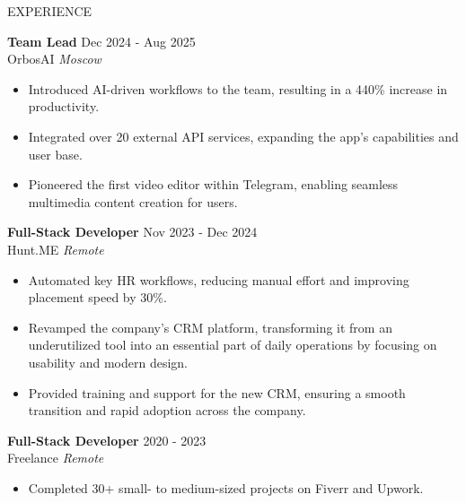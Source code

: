 \documentclass{resume} %
\begin{document}
\begin{rSection}{EXPERIENCE}

\textbf{Team Lead} \hfill Dec 2024 - Aug 2025 \\
OrbosAI \hfill \textit{Moscow}
 \begin{itemize}
    \itemsep -3pt {} 
    \item Introduced AI-driven workflows to the team, resulting in a 440\% increase in productivity.
     \item Integrated over 20 external API services, expanding the app’s capabilities and user base.
     \item Pioneered the first video editor within Telegram, enabling seamless multimedia content creation for users.
 \end{itemize}
 

\textbf{Full-Stack Developer} \hfill Nov 2023 - Dec 2024\\
Hunt.ME \hfill \textit{Remote}
 \begin{itemize}
    \itemsep -3pt {} 
     \item Automated key HR workflows, reducing manual effort and improving placement speed by  30\%.
     \item Revamped the company’s CRM platform, transforming it from an underutilized tool into an essential part of daily operations by focusing on usability and modern design.
    \item Provided training and support for the new CRM, ensuring a smooth transition and rapid adoption across the company.
 \end{itemize}

 \textbf{Full-Stack Developer} \hfill 2020 - 2023\\
Freelance \hfill \textit{Remote}
 \begin{itemize}
    \itemsep -3pt {} 
     \item Completed 30+ small- to medium-sized projects on Fiverr and Upwork.
 \end{itemize}

\end{rSection} 

\end{document}
